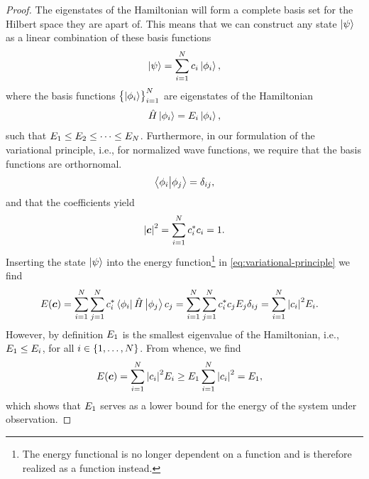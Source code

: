         \begin{proof}
            The eigenstates of the Hamiltonian will form a complete basis set
            for the Hilbert space they are apart of.
            This means that we can construct any state $\ket{\psi}$ as a linear
            combination of these basis functions
            \begin{align}
                \ket{\psi} = \sum_{i = 1}^{N} c_{i}\ket{\phi_i},
            \end{align}
            where the basis functions $\left\{ \ket{\phi_i} \right\}_{i = 1}^{N}$ are
            eigenstates of the Hamiltonian
            \begin{align}
                \hat{H}\ket{\phi_i} = E_i\ket{\phi_i},
            \end{align}
            such that $E_1 \leq E_2 \leq \dots \leq E_N$.
            Furthermore, in our formulation of the variational principle, i.e.,
            for normalized wave functions, we require that the basis functions
            are orthornomal.
            \begin{align}
                \braket{\phi_i}{\phi_j} = \delta_{ij},
            \end{align}
            and that the coefficients yield
            \begin{align}
                \abs{\boldsymbol{c}}^2 = \sum_{i = 1}^{N} c^{*}_{i}c_{i} = 1.
            \end{align}
            Inserting the state $\ket{\psi}$ into the energy
            function\footnote{%
                The energy functional is no longer dependent on a function and
                is therefore realized as a function instead.
            } in \autoref{eq:variational-principle} we find
            \begin{align}
                E(\boldsymbol{c})
                &= \sum_{i = 1}^{N}\sum_{j = 1}^{N}
                c^{*}_i\bra{\phi_i}\hat{H}\ket{\phi_j}c_j
                = \sum_{i = 1}^{N}\sum_{j = 1}^{N}
                c^{*}_i c_j E_j\delta_{ij}
                = \sum_{i = 1}^{N}
                \abs{c_i}^2 E_i.
            \end{align}
            However, by definition $E_1$ is the smallest eigenvalue of the
            Hamiltonian, i.e., $E_1 \leq E_i$, for all $i \in
            \left\{ 1, \dots, N \right\}$.
            From whence, we find
            \begin{align}
                E(\boldsymbol{c})
                &= \sum_{i = 1}^{N}
                \abs{c_i}^2 E_i
                \geq
                E_1 \sum_{i = 1}^{N}
                \abs{c_i}^{2}
                = E_1,
            \end{align}
            which shows that $E_1$ serves as a lower bound for the energy
            of the system under observation.
        \end{proof}

